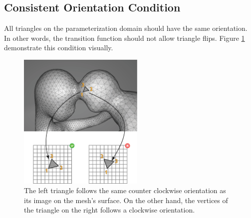 \subsection{Consistent Orientation Condition}
\label{section:consistent_otrientation_cond}
All triangles on the parameterization domain should have the same orientation. In other words, the transition function should not allow triangle flips. Figure \ref{fig:orientation_req} demonstrate this condition visually.
\begin{figure}[ht]
\centering
\includegraphics[width=6cm]{figures/orientation/orientation.png}
\caption[The Orientation Requirement]{The left triangle follows the same counter clockwise orientation as its image on the mesh's surface. On the other hand, the vertices of the triangle on the right follows a clockwise orientation.}
\label{fig:orientation_req}
\end{figure}
